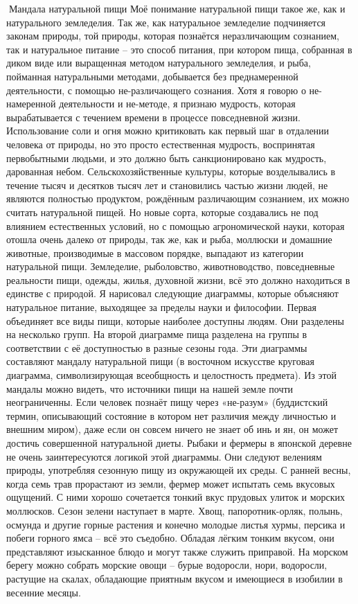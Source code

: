 \documentclass[a4paper]{book}
\begin{document}
Мандала натуральной пищи
Моё понимание натуральной пищи такое же, как и натурального земледелия. Так же, как
натуральное земледелие подчиняется законам природы, той природы, которая познаётся неразличающим сознанием, так и натуральное питание – это способ питания, при котором
пища, собранная в диком виде или выращенная методом натурального земледелия, и рыба,
пойманная натуральными методами, добывается без преднамеренной деятельности, с
помощью не-различающего сознания.
Хотя я говорю о не-намеренной деятельности и не-методе, я признаю мудрость, которая
вырабатывается с течением времени в процессе повседневной жизни. Использование соли и
огня можно критиковать как первый шаг в отдалении человека от природы, но это просто
естественная мудрость, воспринятая первобытными людьми, и это должно быть
санкционировано как мудрость, дарованная небом.
Сельскохозяйственные культуры, которые возделывались в течение тысяч и десятков
тысяч лет и становились частью жизни людей, не являются полностью продуктом,
рождённым различающим сознанием, их можно считать натуральной пищей. Но новые
сорта, которые создавались не под влиянием естественных условий, но с помощью
агрономической науки, которая отошла очень далеко от природы, так же, как и рыба,
моллюски и домашние животные, производимые в массовом порядке, выпадают из
категории натуральной пищи.
Земледелие, рыболовство, животноводство, повседневные реальности пищи, одежды,
жилья, духовной жизни, всё это должно находиться в единстве с природой.
Я нарисовал следующие диаграммы, которые объясняют натуральное питание,
выходящее за пределы науки и философии. Первая объединяет все виды пищи, которые
наиболее доступны людям. Они разделены на несколько групп. На второй диаграмме пища
разделена на группы в соответствии с её доступностью в разные сезоны года. Эти диаграммы
составляют мандалу натуральной пищи (в восточном искусстве круговая диаграмма,
символизирующая всеобщность и целостность предмета). Из этой мандалы можно видеть,
что источники пищи на нашей земле почти неограниченны. Если человек познаёт пищу
через «не-разум» (буддистский термин, описывающий состояние в котором нет различия
между личностью и внешним миром), даже если он совсем ничего не знает об инь и ян, он
может достичь совершенной натуральной диеты.
Рыбаки и фермеры в японской деревне не очень заинтересуются логикой этой
диаграммы. Они следуют велениям природы, употребляя сезонную пищу из окружающей их
среды.
С ранней весны, когда семь трав прорастают из земли, фермер может испытать семь
вкусовых ощущений. С ними хорошо сочетается тонкий вкус прудовых улиток и морских
моллюсков.
Сезон зелени наступает в марте. Хвощ, папоротник-орляк, полынь, осмунда и другие
горные растения и конечно молодые листья хурмы, персика и побеги горного ямса – всё это
съедобно. Обладая лёгким тонким вкусом, они представляют изысканное блюдо и могут
также служить приправой. На морском берегу можно собрать морские овощи – бурые
водоросли, нори, водоросли, растущие на скалах, обладающие приятным вкусом и
имеющиеся в изобилии в весенние месяцы.
\end{document}
